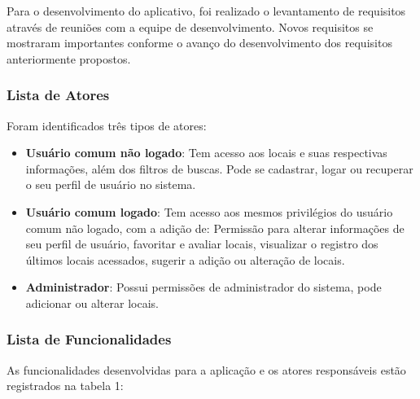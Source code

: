     Para o desenvolvimento do aplicativo, foi realizado o levantamento de requisitos através de reuniões com a equipe de desenvolvimento. Novos requisitos se mostraram importantes conforme o avanço do desenvolvimento dos requisitos anteriormente propostos.

\subsubsection{Lista de Atores}

    Foram identificados três tipos de atores:

    \begin{itemize}
        \item \textbf{Usuário comum não logado}: Tem acesso aos locais e suas respectivas informações, além dos filtros de buscas. Pode se cadastrar, logar ou recuperar o seu perfil de usuário no sistema.
        \item \textbf{Usuário comum logado}: Tem acesso aos mesmos privilégios do usuário comum não logado, com a adição de: Permissão para alterar informações de seu perfil de usuário, favoritar e avaliar locais, visualizar o registro dos últimos locais acessados, sugerir a adição ou alteração de locais. 
        \item \textbf{Administrador}: Possui permissões de administrador do sistema, pode adicionar ou alterar locais.
    \end{itemize}

\subsubsection{Lista de Funcionalidades}

    As funcionalidades desenvolvidas para a aplicação e os atores responsáveis estão registrados na tabela 1:

